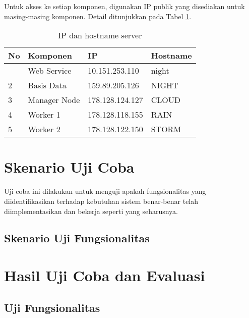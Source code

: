 		\indent Untuk akses ke setiap komponen, digunakan IP publik yang disediakan untuk masing-masing komponen. Detail ditunjukkan pada Tabel \ref{ipserver}.
		\begin{longtable}{|p{}|p{}|p{}|p{}|}
			\caption{IP dan hostname server} \label{ipserver} \\
			\hline
			\textbf{No} & \textbf{Komponen} & \textbf{IP} & \textbf{Hostname} \\ \hline
			\endhead
			\endfoot
			\endlastfoot
			1 & Web Service & 10.151.253.110 & night \\ \hline
			2 & Basis Data & 159.89.205.126 & NIGHT \\ \hline
			3 & Manager Node & 178.128.124.127 & CLOUD \\ \hline
			4 & Worker 1 & 178.128.118.155 & RAIN \\ \hline
			5 & Worker 2 & 178.128.122.150 & STORM \\ \hline
		\end{longtable}
	
	\section{Skenario Uji Coba}
		Uji coba ini dilakukan untuk menguji apakah fungsionalitas yang diidentifikasikan terhadap kebutuhan sistem benar-benar telah diimplementasikan dan bekerja seperti yang seharusnya.
		
	\subsection{Skenario Uji Fungsionalitas}
	
	\section{Hasil Uji Coba dan Evaluasi}
	\subsection{Uji Fungsionalitas}